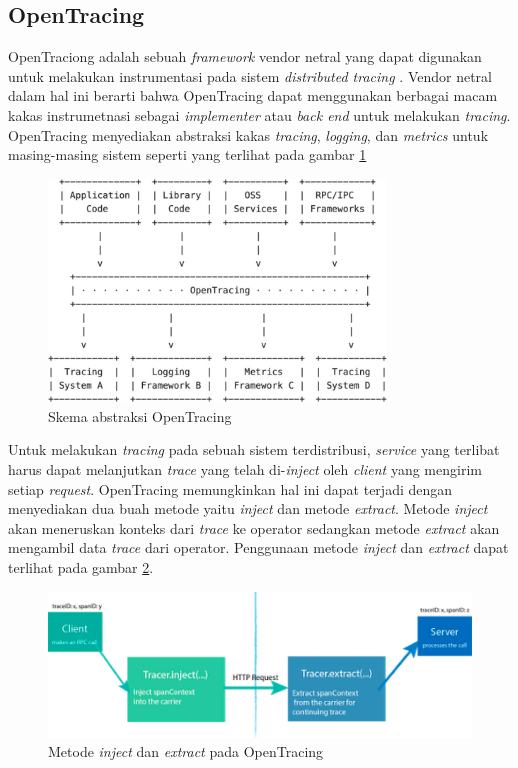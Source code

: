 \subsection{OpenTracing}

OpenTraciong adalah sebuah \textit{framework} vendor netral yang dapat digunakan untuk melakukan instrumentasi pada sistem \textit{distributed tracing} \citep{opentracing}. Vendor netral dalam hal ini berarti bahwa OpenTracing dapat menggunakan berbagai macam kakas instrumetnasi sebagai \textit{implementer} atau \textit{back end} untuk melakukan \textit{tracing}. OpenTracing menyediakan abstraksi kakas \textit{tracing}, \textit{logging}, dan \textit{metrics} untuk masing-masing sistem seperti yang terlihat pada gambar \ref{ch2-opentracing-1}
\begin{figure}[htb]
	\centering
	\includegraphics[width=0.8\textwidth]{resources/ch2/ch2-opentracing.png}
	\caption{Skema abstraksi OpenTracing \citep{opentracing}}
	\label{ch2-opentracing-1}
\end{figure}

Untuk melakukan \textit{tracing} pada sebuah sistem terdistribusi, \textit{service} yang terlibat harus dapat melanjutkan \textit{trace} yang telah di-\textit{inject} oleh \textit{client} yang mengirim setiap \textit{request}. OpenTracing memungkinkan hal ini dapat terjadi dengan menyediakan dua buah metode yaitu \textit{inject} dan metode \textit{extract}. Metode \textit{inject} akan meneruskan konteks dari \textit{trace} ke operator sedangkan metode \textit{extract} akan mengambil data \textit{trace} dari operator. Penggunaan metode \textit{inject} dan \textit{extract} dapat terlihat pada gambar \ref{ch2-opentracing-2}.
\begin{figure}[htb]
	\centering
	\includegraphics[width=1\textwidth]{resources/ch2/inject-extract.png}
	\caption{Metode \textit{inject} dan \textit{extract} pada OpenTracing \citep{opentracing}}
	\label{ch2-opentracing-2}
\end{figure}


